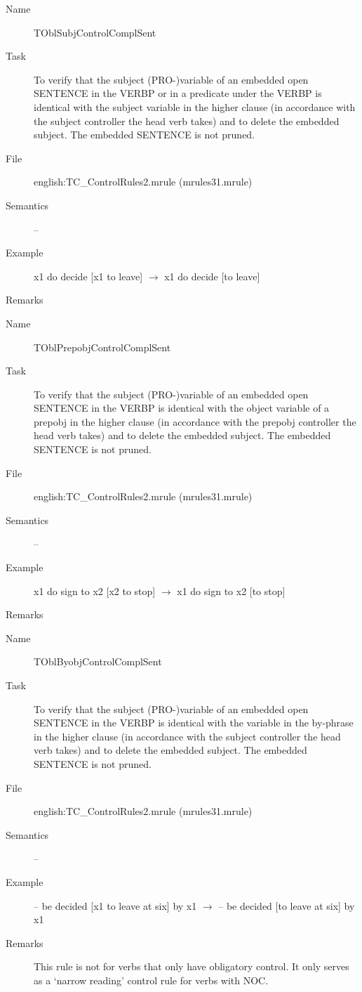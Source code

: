 \begin{description}
\vspace{1 cm}
\begin{description}
\item[Name]  TOblSubjControlComplSent
\item[Task] To verify that  the subject (PRO-)variable of an embedded 
open SENTENCE in the VERBP or in a predicate under the VERBP is 
identical with the subject variable in the higher clause (in accordance with 
the subject controller the head verb takes)
and to delete the embedded subject. The embedded SENTENCE is not pruned.
\item[File] english:TC\_ControlRules2.mrule (mrules31.mrule)
\item[Semantics] --
\item[Example] x1 do decide [x1 to leave] $\rightarrow$ x1 do decide [to 
leave]
\item[Remarks] 
\end{description}

\vspace{1 cm}
\begin{description}
\item[Name] TOblPrepobjControlComplSent
\item[Task] To verify that  the subject (PRO-)variable of an embedded 
open SENTENCE in the VERBP is 
identical with the object variable of a prepobj in the higher clause (in 
accordance with the prepobj controller the head verb takes)
and to delete the embedded subject. The embedded SENTENCE is not pruned.
\item[File] english:TC\_ControlRules2.mrule (mrules31.mrule)
\item[Semantics] --
\item[Example] x1 do sign to x2 [x2 to stop] $\rightarrow$ x1 do sign to x2 
[to stop]
\item[Remarks] 
\end{description}

\vspace{1 cm}
\begin{description}
\item[Name]   TOblByobjControlComplSent
\item[Task] To verify that  the subject (PRO-)variable of an embedded 
open SENTENCE in the VERBP is 
identical with the variable in the by-phrase in the higher clause 
(in accordance with the subject controller the head verb takes)
and to delete the embedded subject. The embedded SENTENCE is not pruned.
\item[File] english:TC\_ControlRules2.mrule (mrules31.mrule)
\item[Semantics] --
\item[Example] -- be decided [x1 to leave at six] by x1 $\rightarrow$ -- be 
decided [to leave at six] by x1
\item[Remarks] This rule is not for verbs that only have obligatory control. It 
only serves as a  `narrow reading' control rule for verbs with NOC.
\end{description}


\end{description}
